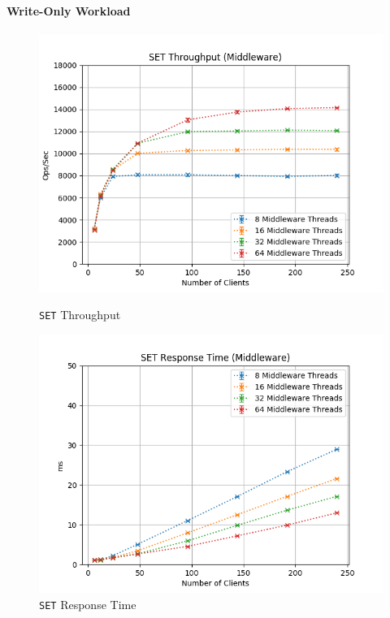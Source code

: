 \documentclass[11pt,a4paper]{article}
\begin{document}
\paragraph{Write-Only Workload}
%
\begin{figure}[H]
	\centering
	\captionsetup{width=0.4\textwidth}
    \begin{minipage}{0.5\textwidth}
        \centering
        \includegraphics[width=\textwidth]{../illustrations/plots/2_1_one_middleware/1-0/middleware_set_tp_s.png}
        \caption{\texttt{SET} Throughput}
        \label{fig:one_middleware_set_tp_mw}
    \end{minipage}\hfill
    \begin{minipage}{0.5\textwidth}
        \centering
        \includegraphics[width=\textwidth]{../illustrations/plots/2_1_one_middleware/1-0/middleware_set_rt_ms.png}
        \caption{\texttt{SET} Response Time}
        \label{fig:one_middleware_set_rt_mw}
    \end{minipage}
\end{figure}
\end{document}
